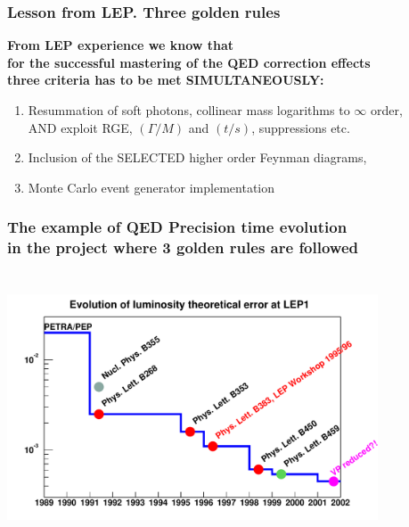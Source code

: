 \documentclass{beamer}
\newcommand{\cbl}{\color{blue}}
\newcommand{\crd}{\color{red}}
\newcommand{\cmg}{\color{magenta}}
\newcommand{\yel}{\color{yellow}}
\begin{document}
\begin{frame}[fragile]
\frametitle{\bf Lesson from LEP. {\yel Three golden rules} }

\bf
From LEP experience we know that\\
for the successful mastering of the QED correction effects\\
three criteria has to be met SIMULTANEOUSLY:
\begin{enumerate}
\item\cbl
Resummation of soft photons, collinear mass logarithms to $\infty$ order,\\
AND exploit RGE, $(\Gamma/M)$ and $(t/s)$, suppressions etc.
\item\cmg
Inclusion of the SELECTED higher order Feynman diagrams,
\item\crd
Monte Carlo event generator implementation
\end{enumerate}


\end{frame}


\begin{frame}[fragile]
\frametitle{\bf {\yel The example of QED Precision time evolution}\\
 in the project where {\yel 3 golden rules} are followed}

\vspace{-2mm}
{\includegraphics[width=110mm,height=80mm]{cFigA.pdf}}

\end{frame}
\end{document}
